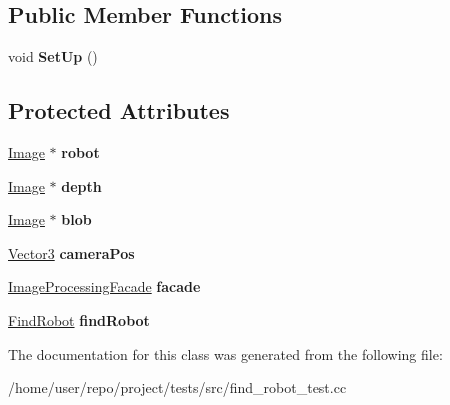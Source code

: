 \subsection*{Public Member Functions}
\begin{DoxyCompactItemize}
\item 
\mbox{\label{classFindRobotTest_a69c8326a85f9f30b918555197160c29a}} 
void {\bfseries Set\+Up} ()
\end{DoxyCompactItemize}
\subsection*{Protected Attributes}
\begin{DoxyCompactItemize}
\item 
\mbox{\label{classFindRobotTest_a9a744772cdef7072a8bbab420ef65fa4}} 
\hyperlink{classImage}{Image} $\ast$ {\bfseries robot}
\item 
\mbox{\label{classFindRobotTest_a8bf80cbf9f44ca61c1d0da2158e6a621}} 
\hyperlink{classImage}{Image} $\ast$ {\bfseries depth}
\item 
\mbox{\label{classFindRobotTest_a46c821bad76c3f27b89383e3c7ca0899}} 
\hyperlink{classImage}{Image} $\ast$ {\bfseries blob}
\item 
\mbox{\label{classFindRobotTest_a374a454baef6f6983f892196abc9bc5c}} 
\hyperlink{classVector3}{Vector3} {\bfseries camera\+Pos}
\item 
\mbox{\label{classFindRobotTest_a90dad3e688d09c1cb5815caa691fd511}} 
\hyperlink{classImageProcessingFacade}{Image\+Processing\+Facade} {\bfseries facade}
\item 
\mbox{\label{classFindRobotTest_ae38d4635ebab2e64fc1c880f39350184}} 
\hyperlink{classFindRobot}{Find\+Robot} {\bfseries find\+Robot}
\end{DoxyCompactItemize}


The documentation for this class was generated from the following file\+:\begin{DoxyCompactItemize}
\item 
/home/user/repo/project/tests/src/find\+\_\+robot\+\_\+test.\+cc\end{DoxyCompactItemize}
